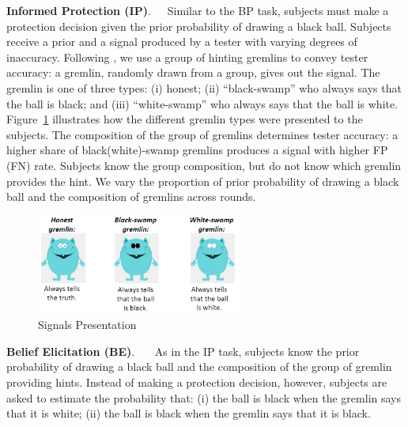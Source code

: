 \documentclass[12pt,a4paper]{article}
\begin{document}
\bigskip
\noindent\textbf{Informed Protection (IP)}.\ \ \ Similar to the BP task, subjects must make a protection decision given the prior probability of drawing a black ball. Subjects receive a prior and a signal produced by a tester with varying degrees of inaccuracy. Following \citet{coutts_good_2019}, we use a group of hinting gremlins to convey tester accuracy: a gremlin, randomly drawn from a group, gives out the signal. The gremlin is one of three types: (i) honest; (ii) ``black-swamp'' who always says that the ball is black; and (iii) ``white-swamp'' who always says that the ball is white. Figure~\ref{fig:Gremlins} illustrates how the different gremlin types were presented to the subjects. The composition of the group of gremlins determines tester accuracy: a higher share of black(white)-swamp gremlins produces a signal with higher FP (FN) rate. Subjects know the group composition, but do not know which gremlin provides the hint. We vary the proportion of prior probability of drawing a black ball and the composition of gremlins across rounds.  

\begin{figure}[H]
\centering
\caption{Signals Presentation} \label{fig:Gremlins}
\includegraphics[width=0.6\textwidth]{Graphs/gremlins1.png}
\end{figure}


\bigskip
\noindent\textbf{Belief Elicitation (BE)}.\ \ \ 
As in the IP task, subjects know the prior probability of drawing a black ball and the composition of the group of gremlin providing hints. Instead of making a protection decision, however, subjects are asked to estimate the probability that: (i) the ball is black when the gremlin says that it is white; (ii) the ball is black when the gremlin says that it is black. 
\end{document}
